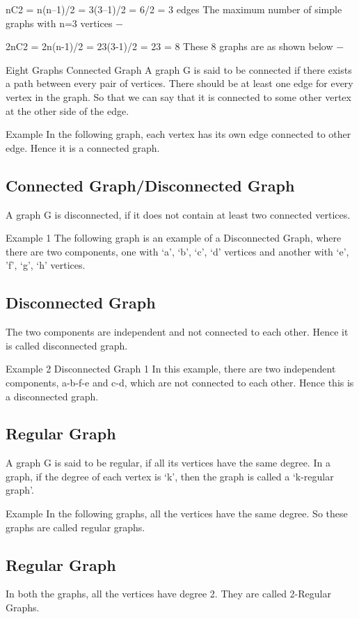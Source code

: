 nC2 = n(n–1)/2
   = 3(3–1)/2
   = 6/2
   = 3 edges
The maximum number of simple graphs with n=3 vertices −

2nC2 = 2n(n-1)/2
   = 23(3-1)/2
   = 23
   = 8
These 8 graphs are as shown below −

Eight Graphs
Connected Graph
A graph G is said to be connected if there exists a path between every pair of vertices. There should be at least one edge for every vertex in the graph. So that we can say that it is connected to some other vertex at the other side of the edge.

Example
In the following graph, each vertex has its own edge connected to other edge. Hence it is a connected graph.

\subsection{Connected Graph/Disconnected Graph}
A graph G is disconnected, if it does not contain at least two connected vertices.

Example 1
The following graph is an example of a Disconnected Graph, where there are two components, one with ‘a’, ‘b’, ‘c’, ‘d’ vertices and another with ‘e’, ’f’, ‘g’, ‘h’ vertices.

\subsection{Disconnected Graph}
The two components are independent and not connected to each other. Hence it is called disconnected graph.

Example 2
Disconnected Graph 1
In this example, there are two independent components, a-b-f-e and c-d, which are not connected to each other. Hence this is a disconnected graph.

\subsection{Regular Graph}
A graph G is said to be regular, if all its vertices have the same degree. In a graph, if the degree of each vertex is ‘k’, then the graph is called a ‘k-regular graph’.

Example
In the following graphs, all the vertices have the same degree. So these graphs are called regular graphs.

\subsection{Regular Graph}
In both the graphs, all the vertices have degree 2. They are called 2-Regular Graphs.

